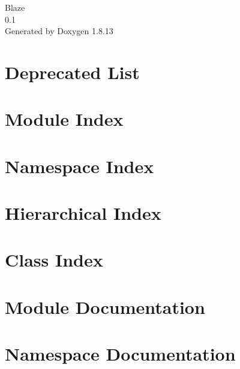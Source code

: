 \documentclass[twoside]{book}
\newcommand{\+}{\discretionary{\mbox{\scriptsize$\hookleftarrow$}}{}{}}
\newcommand{\clearemptydoublepage}{%
  \newpage{\pagestyle{empty}\cleardoublepage}%
}
\begin{document}
\hypersetup{pageanchor=false,
             bookmarksnumbered=true,
             pdfencoding=unicode
            }
\begin{titlepage}
\vspace*{7cm}
\begin{center}%
{\Large Blaze \\[1ex]\large 0.\+1 }\\
\vspace*{1cm}
{\large Generated by Doxygen 1.8.13}\\
\end{center}
\end{titlepage}
\clearemptydoublepage
{}
\tableofcontents
\clearemptydoublepage
{}
\hypersetup{pageanchor=true}

\chapter{Deprecated List}
\label{deprecated}

\chapter{Module Index}

\chapter{Namespace Index}

\chapter{Hierarchical Index}

\chapter{Class Index}

\chapter{Module Documentation}


\chapter{Namespace Documentation}




\end{document}
